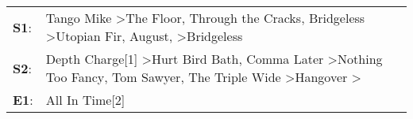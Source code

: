 \begin{supertabular}{p{0.03\textwidth}p{0.92\textwidth}}
 \textbf{S1}:  &                              Tango Mike\textsuperscript{} \textgreater \enspace The Floor\textsuperscript{}, \enspace Through the Cracks\textsuperscript{}, \enspace Bridgeless\textsuperscript{} \textgreater \enspace Utopian Fir\textsuperscript{}, \enspace August\textsuperscript{}, \textsuperscript{} \textgreater \enspace Bridgeless\textsuperscript{}  \enspace  \\
 \textbf{S2}:  &  Depth Charge[1]\textsuperscript{} \textgreater \enspace Hurt Bird Bath\textsuperscript{}, \enspace Comma Later\textsuperscript{} \textgreater \enspace Nothing Too Fancy\textsuperscript{}, \enspace Tom Sawyer\textsuperscript{}, \enspace The Triple Wide\textsuperscript{} \textgreater \enspace Hangover\textsuperscript{} \textgreater {}\textsuperscript{}  \enspace  \\
 \textbf{E1}:  &                                                                                                                                                                                                                                                                                                                                             All In Time[2]\textsuperscript{}  \enspace  \\
\end{supertabular}

